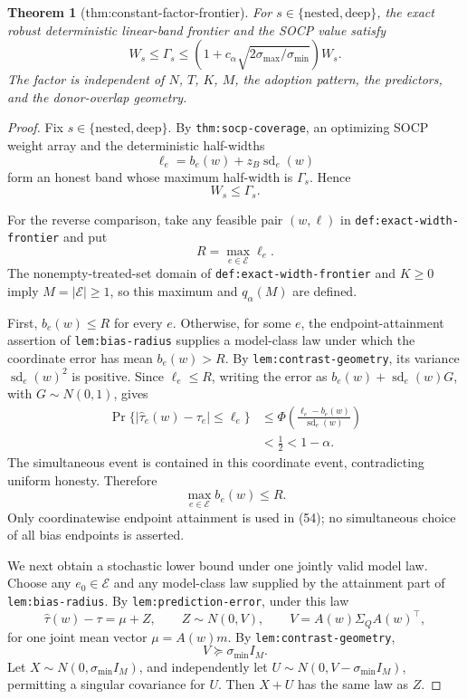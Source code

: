 \documentclass{article}
\newtheorem{theorem}{Theorem}
\begin{document}
\begin{theorem}[thm:constant-factor-frontier]\label{thm:constant-factor-frontier}
For \(s\in\{\mathrm{nested},\mathrm{deep}\}\), the exact robust deterministic linear-band frontier and the SOCP value satisfy \[W_s\le\Gamma_s\le\left(1+c_\alpha\sqrt{2\sigma_{\max}/\sigma_{\min}}\right)W_s.\] The factor is independent of \(N\), \(T\), \(K\), \(M\), the adoption pattern, the predictors, and the donor-overlap geometry.
\end{theorem}
\begin{proof}
Fix \(s\in\{\mathrm{nested},\mathrm{deep}\}\).  By
\texttt{thm:socp-coverage}, an optimizing SOCP weight array and the
deterministic half-widths
\[
 \ell_e=b_e(w)+z_B\operatorname{sd}_e(w) \tag{51}
\]
form an honest band whose maximum half-width is \(\Gamma_s\).  Hence
\[
 W_s\leq\Gamma_s. \tag{52}
\]

For the reverse comparison, take any feasible pair \((w,\ell)\) in
\texttt{def:exact-width-frontier} and put
\[
 R=\max_{e\in\mathcal E}\ell_e. \tag{53}
\]
The nonempty-treated-set domain of \texttt{def:exact-width-frontier} and
\(K\geq0\) imply \(M=|\mathcal E|\geq1\), so this maximum and
\(q_\alpha(M)\) are defined.

First, \(b_e(w)\leq R\) for every \(e\).  Otherwise, for some \(e\), the
endpoint-attainment assertion of \texttt{lem:bias-radius} supplies a
model-class law under which the coordinate error has mean \(b_e(w)>R\).
By \texttt{lem:contrast-geometry}, its variance
\(\operatorname{sd}_e(w)^2\) is positive.  Since \(\ell_e\leq R\), writing
the error as \(b_e(w)+\operatorname{sd}_e(w)G\), with
\(G\sim N(0,1)\), gives
\[
\begin{aligned}
 \Pr\{|\widehat\tau_e(w)-\tau_e|\leq\ell_e\}
 &\leq \Phi\!\left(
 \frac{\ell_e-b_e(w)}{\operatorname{sd}_e(w)}\right)\\
 &<\frac12<1-\alpha.
\end{aligned} \tag{54}
\]
The simultaneous event is contained in this coordinate event, contradicting
uniform honesty.  Therefore
\[
 \max_{e\in\mathcal E}b_e(w)\leq R. \tag{55}
\]
Only coordinatewise endpoint attainment is used in (54); no simultaneous
choice of all bias endpoints is asserted.

We next obtain a stochastic lower bound under one jointly valid model law.
Choose any \(e_0\in\mathcal E\) and any model-class law supplied by the
attainment part of \texttt{lem:bias-radius}.  By
\texttt{lem:prediction-error}, under this law
\[
 \widehat\tau(w)-\tau=\mu+Z,
 \qquad Z\sim N(0,V),
 \qquad V=A(w)\Sigma_QA(w)^{\top}, \tag{56}
\]
for one joint mean vector \(\mu=A(w)m\).  By
\texttt{lem:contrast-geometry},
\[
 V\succeq\sigma_{\min}I_M. \tag{57}
\]
Let \(X\sim N(0,\sigma_{\min}I_M)\), and independently let
\(U\sim N(0,V-\sigma_{\min}I_M)\), permitting a singular covariance for
\(U\).  Then \(X+U\) has the same law as \(Z\).


\end{proof}
\end{document}
